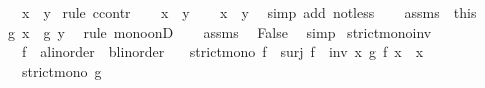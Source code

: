 \begin{isabellebody}
\ \ \ {\isachardoublequoteopen}x\ {\isachargreater}{\kern0pt}\ y{\isachardoublequoteclose}\isanewline
%
\isadelimproof
%
\endisadelimproof
%
\isatagproof
{}\isamarkupfalse%
\ {\isacharparenleft}{\kern0pt}rule\ ccontr{\isacharparenright}{\kern0pt}\isanewline
\ \ \isamarkupfalse%
\ {\isachardoublequoteopen}{\isasymnot}x\ {\isachargreater}{\kern0pt}\ y{\isachardoublequoteclose}\isanewline
\ \ \isamarkupfalse%
\ {\isachardoublequoteopen}x\ {\isasymle}\ y{\isachardoublequoteclose}\ \isamarkupfalse%
\ {\isacharparenleft}{\kern0pt}simp\ add{\isacharcolon}{\kern0pt}\ not{\isacharunderscore}{\kern0pt}less{\isacharparenright}{\kern0pt}\isanewline
\ \ \isamarkupfalse%
\ assms{\isacharparenleft}{\kern0pt}{}{\isacharminus}{\kern0pt}{}{\isacharparenright}{\kern0pt}\ \ this\ \isamarkupfalse%
\ {\isachardoublequoteopen}g\ x\ {\isasymle}\ g\ y{\isachardoublequoteclose}\ \isamarkupfalse%
\ {\isacharparenleft}{\kern0pt}rule\ mono{\isacharunderscore}{\kern0pt}onD{\isacharparenright}{\kern0pt}\isanewline
\ \ \isamarkupfalse%
\ assms{\isacharparenleft}{\kern0pt}{}{\isacharparenright}{\kern0pt}\ \isamarkupfalse%
\ False\ \isamarkupfalse%
\ simp\isanewline
{}\isamarkupfalse%
%
\endisatagproof
{\isafoldproof}%
%
\isadelimproof
\isanewline
%
\endisadelimproof
\isanewline
{}\isamarkupfalse%
\ strict{\isacharunderscore}{\kern0pt}mono{\isacharunderscore}{\kern0pt}inv{\isacharcolon}{\kern0pt}\isanewline
\ \ \ f\ {\isacharcolon}{\kern0pt}{\isacharcolon}{\kern0pt}\ {\isachardoublequoteopen}{\isacharparenleft}{\kern0pt}{\isacharprime}{\kern0pt}a{\isacharcolon}{\kern0pt}{\isacharcolon}{\kern0pt}linorder{\isacharparenright}{\kern0pt}\ {\isasymRightarrow}\ {\isacharparenleft}{\kern0pt}{\isacharprime}{\kern0pt}b{\isacharcolon}{\kern0pt}{\isacharcolon}{\kern0pt}linorder{\isacharparenright}{\kern0pt}{\isachardoublequoteclose}\isanewline
\ \ \ {\isachardoublequoteopen}strict{\isacharunderscore}{\kern0pt}mono\ f{\isachardoublequoteclose}\ \ {\isachardoublequoteopen}surj\ f{\isachardoublequoteclose}\ \ inv{\isacharcolon}{\kern0pt}\ {\isachardoublequoteopen}{\isasymAnd}x{\isachardot}{\kern0pt}\ g\ {\isacharparenleft}{\kern0pt}f\ x{\isacharparenright}{\kern0pt}\ {\isacharequal}{\kern0pt}\ x{\isachardoublequoteclose}\isanewline
\ \ \ {\isachardoublequoteopen}strict{\isacharunderscore}{\kern0pt}mono\ g{\isachardoublequoteclose}\isanewline

\end{isabellebody}
